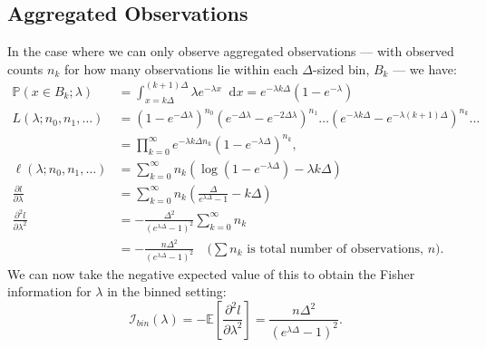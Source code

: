 \documentclass[11pt,a4,twosided,singlespacing,titlepagenumber=on,numbers=endperiod]{scrreprt}
\numberwithin{equation}{chapter} %
\theoremstyle{remark}
\newcommand*{\diff}{\mathop{}\!\mathrm{d}}  %
\begin{document}
\subsection{Aggregated Observations}
In the case where we can only observe aggregated observations --- with observed counts $n_k$ for how many observations lie within each $\Delta$-sized bin, $B_k$ --- we have:
\begin{equation*}
	\begin{aligned}
		\mathbb{P}(x \in B_k; \lambda) &= \int_{x=k\Delta}^{(k+1)\Delta}{\lambda e^{- \lambda x} \diff x} = e^{- \lambda k\Delta}(1 - e^{- \lambda}) \\
		L(\lambda ; n_0, n_1, \dots) &= (1-e^{- \Delta\lambda})^{n_0}(e^{- \Delta\lambda} - e^{- 2\Delta\lambda})^{n_1} \dots (e^{- \lambda k\Delta} - e^{-\lambda (k+1)\Delta})^{n_k} \dots \\
		&= \prod_{k=0}^{\infty}{e^{- \lambda k \Delta n_k}(1 - e^{- \lambda \Delta})^{n_k}}, \\
		\ell(\lambda; n_0, n_1, \dots) &= \sum_{k=0}^\infty n_k \left(\log(1 - e^{- \lambda \Delta}) - \lambda k \Delta \right) \\
		\frac{\partial l}{\partial \lambda} &= \sum_{k=0}^\infty n_k \left(\frac{\Delta}{e^{\lambda \Delta} - 1} - k \Delta \right)\\
		\frac{\partial^2 l}{\partial \lambda^2} &= - \frac{\Delta^2}{(e^{\lambda \Delta} - 1)^2} \sum_{k=0}^\infty {n_k} \\
		&= - \frac{n\Delta^2}{(e^{\lambda \Delta} - 1)^2} \quad \text{($\sum n_k$ is total number of observations, $n$)}.
	\end{aligned}
\end{equation*}
We can now take the negative expected value of this to obtain the Fisher information for $\lambda$ in the binned setting:
\begin{equation}\label{eq:exp_fisher}
	\mathcal{I}_{bin}(\lambda) = - \mathbb{E}\left[ \frac{\partial^2 l}{\partial \lambda^2} \right] = \frac{n\Delta^2}{(e^{\lambda \Delta} - 1)^2}.
\end{equation}
\newpage
\end{document}
